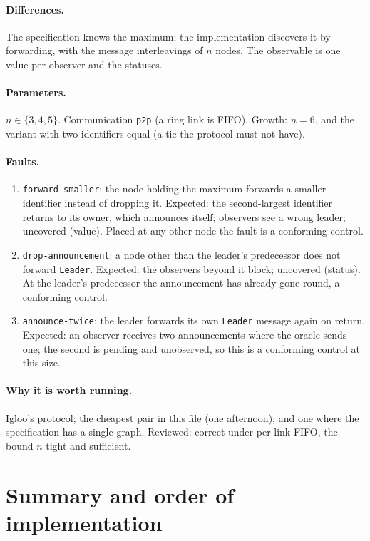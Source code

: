 \documentclass[11pt,a4paper]{article}
\newcommand{\code}[1]{\texttt{#1}}
\begin{document}
\paragraph{Differences.} The specification knows the maximum; the implementation discovers it
by forwarding, with the message interleavings of $n$ nodes. The observable is one value per
observer and the statuses.

\paragraph{Parameters.} $n \in \{3, 4, 5\}$. Communication \code{p2p} (a ring link is FIFO).
Growth: $n = 6$, and the variant with two identifiers equal (a tie the protocol must not have).

\paragraph{Faults.}
\begin{enumerate}
  \item \code{forward-smaller}: the node holding the maximum forwards a smaller identifier
        instead of dropping it. Expected: the second-largest identifier returns to its owner,
        which announces itself; observers see a wrong leader; uncovered (value). Placed at any
        other node the fault is a conforming control.
  \item \code{drop-announcement}: a node other than the leader's predecessor does not forward
        \code{Leader}. Expected: the observers beyond it block; uncovered (status). At the
        leader's predecessor the announcement has already gone round, a conforming control.
  \item \code{announce-twice}: the leader forwards its own \code{Leader} message again on
        return. Expected: an observer receives two announcements where the oracle sends one;
        the second is pending and unobserved, so this is a conforming control at this size.
\end{enumerate}

\paragraph{Why it is worth running.} Igloo's protocol; the cheapest pair in this file (one
afternoon), and one where the specification has a single graph. Reviewed: correct under
per-link FIFO, the bound $n$ tight and sufficient.

\section{Summary and order of implementation}
\end{document}
